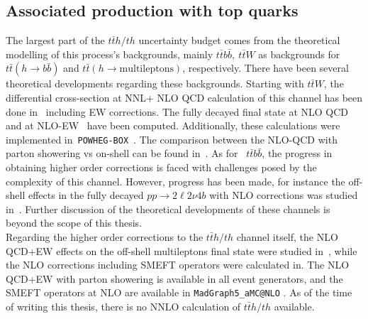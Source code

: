 \subsection{Associated production with top quarks}
The largest part of the $t\bar t h/th$ uncertainty budget comes from the theoretical modelling of this process's backgrounds, mainly $t \bar t b\bar b,\ t\bar t W$ as backgrounds for $ t\bar t (h \to b\bar b)$ and $ t \bar t ( h \to \mathrm{multileptons})$, respectively. There have been several theoretical developments regarding these backgrounds. Starting with $t\bar t W$, the differential cross-section at NNL+ NLO QCD calculation of this channel has been done in~\cite{Broggio:2019ewu,Kulesza:2020nfh} including EW corrections. The fully decayed final state at NLO QCD~\cite{Bevilacqua:2020pzy,Denner:2020hgg,Bevilacqua:2020srb} and at NLO-EW~\cite{Denner:2021hqi} have been computed. Additionally, these calculations were implemented in~\texttt{POWHEG-BOX}~\cite{Cordero:2021iau}. The comparison between the NLO-QCD with parton showering vs on-shell can be found in~\cite{Bevilacqua:2021tzp}. As for ~$t \bar t b\bar b$, the progress in obtaining higher order corrections is faced with challenges posed by the complexity of this channel. However, progress has been made, for instance the off-shell effects in the fully decayed $ pp \to 2 \ell 2 \nu  4 b$ with NLO corrections was studied in~\cite{Denner:2020orv,Bevilacqua:2021cit}. Further discussion of the theoretical developments of these channels is beyond the scope of this thesis. \\
Regarding the higher order corrections to the $t\bar t h /t h$ channel itself, the NLO QCD+EW effects on the off-shell multileptons final state  were studied in~\cite{Denner:2019zdz},  while the NLO corrections including SMEFT operators were calculated in\cite{Maltoni:2016yxb}. The NLO QCD+EW with parton showering is available in all event generators, and the SMEFT operators at NLO are available in \texttt{MadGraph5\_aMC@NLO} .  As of the time of writing this thesis, there is no NNLO calculation of $t\bar t h /t h$ available. 

